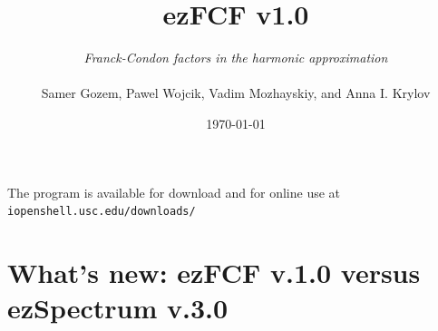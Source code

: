 \documentclass[11pt]{article}
\begin{document}
\newcommand{\ezS}{\texttt{ezSpectrum} }
\newcommand{\ezFCF}{\texttt{ezFCF}}
\newcommand{\ezSnospace}{\texttt{ezSpectrum}}
\newcommand{\ai}{\textit{ab initio} }
\newcommand{\xml}{\texttt{.xml} }

\newcommand{\ul}[2]{\texttt{#1{\underline{~}#2}} } %

\newcommand{\ket}[1]{|#1\rangle}      %
\newcommand{\bra}[1]{\langle #1|}     %
\newcommand{\braket}[2]{\langle #1|#2\rangle}      %



\title{ezFCF v1.0}
\author{{\em Franck-Condon factors in the harmonic approximation}\\ 
  \vspace{20mm}\\
  Samer Gozem, Pawel Wojcik, Vadim Mozhayskiy, and Anna I. Krylov\\ \vspace{20mm}}
\date{\today}
\maketitle

\thispagestyle{empty}

\begin{center}
\vspace{30mm}
\normalsize{The program is available for download and for online use at\\ 
\texttt{iopenshell.usc.edu/downloads/} }
\end{center}

\clearpage
\thispagestyle{empty}

\tableofcontents


\clearpage

\section*{What's new: ezFCF v.1.0 versus ezSpectrum v.3.0}
\end{document}
